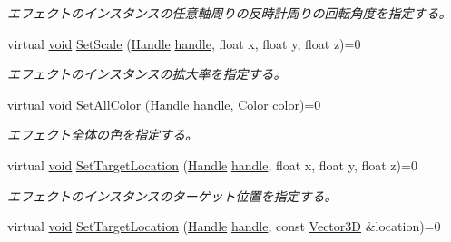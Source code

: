 \begin{DoxyCompactItemize}
\begin{DoxyCompactList}\small\item\em エフェクトのインスタンスの任意軸周りの反時計周りの回転角度を指定する。 \end{DoxyCompactList}\item 
virtual \mbox{\hyperlink{namespace_effekseer_ab34c4088e512200cf4c2716f168deb56}{void}} \mbox{\hyperlink{class_effekseer_1_1_manager_a14e45b2fc8ff1d2df98ce94c70b8cde1}{Set\+Scale}} (\mbox{\hyperlink{namespace_effekseer_afba58b8d812da862190e9bbfc040824a}{Handle}} \mbox{\hyperlink{namespace_effekseer_afd99b336b206999bdcca3e431648efbc}{handle}}, float x, float y, float z)=0
\begin{DoxyCompactList}\small\item\em エフェクトのインスタンスの拡大率を指定する。 \end{DoxyCompactList}\item 
virtual \mbox{\hyperlink{namespace_effekseer_ab34c4088e512200cf4c2716f168deb56}{void}} \mbox{\hyperlink{class_effekseer_1_1_manager_ae0613bf8762c0948d9361d558ba4b56b}{Set\+All\+Color}} (\mbox{\hyperlink{namespace_effekseer_afba58b8d812da862190e9bbfc040824a}{Handle}} \mbox{\hyperlink{namespace_effekseer_afd99b336b206999bdcca3e431648efbc}{handle}}, \mbox{\hyperlink{struct_effekseer_1_1_color}{Color}} color)=0
\begin{DoxyCompactList}\small\item\em エフェクト全体の色を指定する。 \end{DoxyCompactList}\item 
virtual \mbox{\hyperlink{namespace_effekseer_ab34c4088e512200cf4c2716f168deb56}{void}} \mbox{\hyperlink{class_effekseer_1_1_manager_a3c709343770c431420772ab3ca6639e1}{Set\+Target\+Location}} (\mbox{\hyperlink{namespace_effekseer_afba58b8d812da862190e9bbfc040824a}{Handle}} \mbox{\hyperlink{namespace_effekseer_afd99b336b206999bdcca3e431648efbc}{handle}}, float x, float y, float z)=0
\begin{DoxyCompactList}\small\item\em エフェクトのインスタンスのターゲット位置を指定する。 \end{DoxyCompactList}\item 
virtual \mbox{\hyperlink{namespace_effekseer_ab34c4088e512200cf4c2716f168deb56}{void}} \mbox{\hyperlink{class_effekseer_1_1_manager_a193e7d5d036ff717ba3755c1fda03758}{Set\+Target\+Location}} (\mbox{\hyperlink{namespace_effekseer_afba58b8d812da862190e9bbfc040824a}{Handle}} \mbox{\hyperlink{namespace_effekseer_afd99b336b206999bdcca3e431648efbc}{handle}}, const \mbox{\hyperlink{struct_effekseer_1_1_vector3_d}{Vector3D}} \&location)=0

\end{DoxyCompactItemize}
